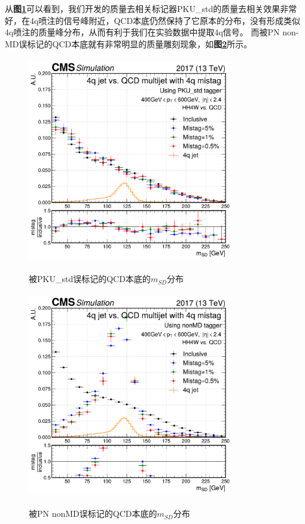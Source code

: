从\textbf{图\ref{fig:5.3}}可以看到，我们开发的质量去相关标记器PKU\_std的质量去相关效果非常好，在4q喷注的信号峰附近，QCD本底仍然保持了它原本的分布，没有形成类似4q喷注的质量峰分布，从而有利于我们在实验数据中提取4q信号。
而被PN non-MD误标记的QCD本底就有非常明显的质量雕刻现象，如\textbf{图\ref{fig:5.4}}所示。

\begin{figure}[H]
 \centering
 \caption{被PKU\_std误标记的QCD本底的$m_{SD}$分布}
 \includegraphics[height=9cm, width=9cm]{pictures/MD_PKU_std_4q.pdf}
 \label{fig:5.3}
\end{figure}

\begin{figure}[H]
 \centering
 \caption{被PN nonMD误标记的QCD本底的$m_{SD}$分布}
 \includegraphics[height=9cm, width=9cm]{pictures/MD_nonMD_4q.pdf}
 \label{fig:5.4}
\end{figure}

